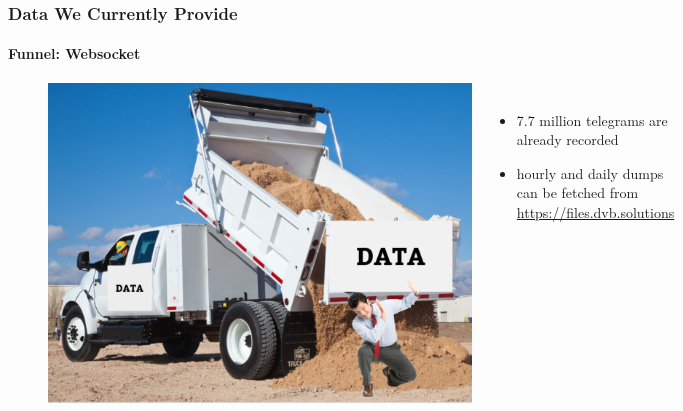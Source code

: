
\begin{frame}[fragile]
\frametitle{Data We Currently Provide}
\framesubtitle{Funnel: Websocket}
\begin{figure}
\begin{columns}
  \includegraphics[height=0.65\textheight]{figs/data_dump.png}
\raggedright
\vspace{0.5cm}

\begin{itemize}
  \item 7.7 million telegrams are already recorded
  \item hourly and daily dumps can be fetched from \url{https://files.dvb.solutions}
\end{itemize}
\end{columns}
\end{figure}
\end{frame}

